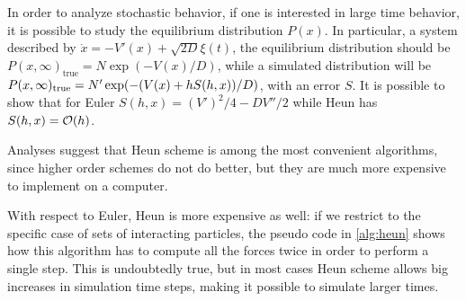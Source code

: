\documentclass[../../master_thesis_np.tex]{subfiles}
\begin{document}
		In order to analyze stochastic behavior, if one is interested in large time behavior, it is possible to study the equilibrium distribution $P(x)$. In particular, a system described by $\dot{x} = -V'(x) + \sqrt{2D}\xi(t)$, the equilibrium distribution should be $P(x, \infty)_{\text{true}} = N \exp(-V(x)/D)$, while a simulated distribution will be $P(x, \infty)_{\text{true}} = N' \exp(-\qty(V(x) + hS(h,x))/D)$, with an error $S$. It is possible to show \cite{mannella_integration_2011} that for Euler $S(h,x) = (V')^2/4 - DV''/2$ while Heun has $S(h,x) = \order{h}$.
		
		Analyses suggest that Heun scheme is among the most convenient algorithms, since higher order schemes do not do better, but they are much more expensive to implement on a computer. 
		
		With respect to Euler, Heun is more expensive as well: if we restrict to the specific case of sets of interacting particles, the pseudo code in \ref{alg:heun} shows how this algorithm has to compute all the forces twice in order to perform a single step. This is undoubtedly true, but in most cases Heun scheme allows big increases in simulation time steps, making it possible to simulate larger times.		
\end{document}

